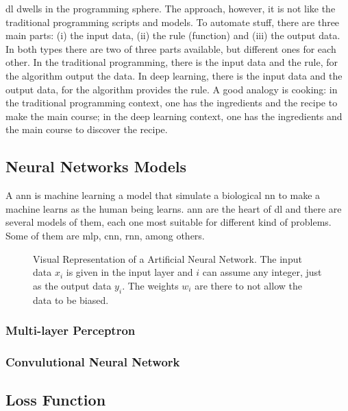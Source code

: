 \gls*{dl} dwells in the programming sphere. The approach, however, it is not like the traditional programming scripts and models. To automate stuff, there are three main parts: (i) the input data, (ii) the rule (function) and (iii) the output data. In both types there are two of three parts available, but different ones for each other. In the traditional programming, there is the input data and the rule, for the algorithm output the data. In deep learning, there is the input data and the output data, for the algorithm provides the rule. A good analogy is cooking: in the traditional programming context, one has the ingredients and the recipe to make the main course; in the deep learning context, one has the ingredients and the main course to discover the recipe.

\subsection{Neural Networks Models}\label{sec:nn_models}

A \gls*{ann} is machine learning a model that simulate a biological \gls*{nn} to make a machine learns as the human being learns.
\gls*{ann} are the heart of \gls*{dl} and there are several models of them, each one most suitable for different kind of problems.
Some of them are \gls*{mlp}, \gls*{cnn}, \gls*{rnn}, among others.
%
\begin{figure}[!htb]
    \centering
    
    \caption[Visual Representation of a Artificial Neural Network]{Visual Representation of a Artificial Neural Network. The input data \(x_i\) is given in the input layer and \(i\) can assume any integer, just as the output data \(y_i\). The weights \(w_i\) are there to not allow the data to be biased.}
\end{figure}

\subsubsection*{Multi-layer Perceptron}

\subsubsection*{Convulutional Neural Network}

\subsection{Loss Function}\label{sec:loss_function}


